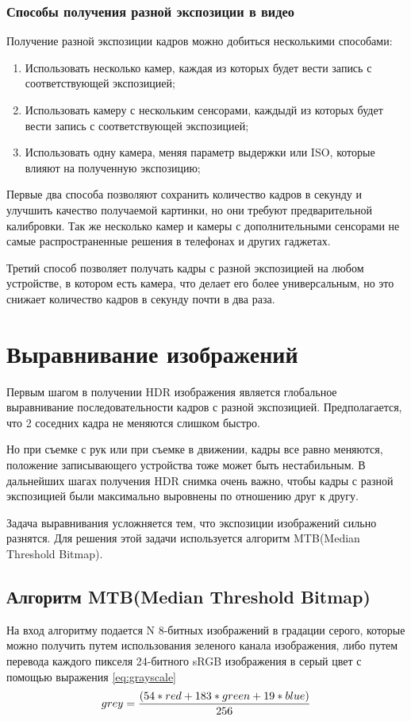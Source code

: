 \subsubsection{ Способы получения разной экспозиции в видео}
    Получение разной экспозиции кадров можно добиться несколькими способами:
\begin{enumerate}
    \item Использовать несколько камер, каждая из которых будет вести запись с соответствующей экспозицией;
    \item Использовать камеру с нескольким сенсорами, каждыдй из которых будет вести запись с соответствующей экспозицией;
    \item Использовать одну камера, меняя параметр выдержки или ISO, которые влияют на полученную экспозицию;
\end{enumerate}

    Первые два способа позволяют сохранить количество кадров в секунду и улучшить качество получаемой картинки, но они требуют предварительной калибровки. Так же несколько камер и камеры с дополнительными сенсорами не самые распространенные решения в телефонах и других гаджетах.
    
    Третий способ позволяет получать кадры с разной экспозицией на любом устройстве, в котором есть камера, что делает его более универсальным, но это снижает количество кадров в секунду почти в два раза.

\section{ Выравнивание изображений}
    Первым шагом в получении HDR изображения является глобальное выравнивание последовательности кадров с разной экспозицией. Предполагается, что 2 соседних кадра не меняются слишком быстро.

    Но при съемке с рук или при съемке в движении, кадры все равно меняются, положение записывающего устройства тоже может быть нестабильным. В дальнейших шагах получения HDR снимка очень важно, чтобы кадры с разной экспозицией были максимально выровнены по отношению друг к другу. 

    Задача выравнивания усложняется тем, что экспозиции изображений сильно разнятся. Для решения этой задачи используется алгоритм MTB(Median Threshold Bitmap).

\subsection{ Алгоритм MTB(Median Threshold Bitmap)}
    На вход алгоритму подается N 8-битных изображений в градации серого, которые можно получить путем использования зеленого канала изображения, либо путем перевода каждого пикселя 24-битного sRGB изображения в серый цвет с помощью выражения \ref{eq:grayscale}
\begin{equation}
    \centering{
        grey = \frac{(54*red + 183*green + 19*blue)}{256}}
    \label{eq:grayscale}
\end{equation}

